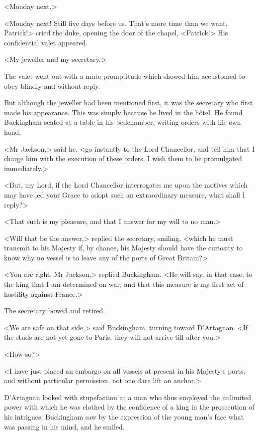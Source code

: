 <Monday next.> 

<Monday next! Still five days before us. That's more time than we want. Patrick!> cried the duke, opening the door of the chapel, <Patrick!> His confidential valet appeared. 

<My jeweller and my secretary.> 

The valet went out with a mute promptitude which showed him accustomed to obey blindly and without reply. 

But although the jeweller had been mentioned first, it was the secretary who first made his appearance. This was simply because he lived in the hôtel. He found Buckingham seated at a table in his bedchamber, writing orders with his own hand. 

<Mr Jackson,> said he, <go instantly to the Lord Chancellor, and tell him that I charge him with the execution of these orders. I wish them to be promulgated immediately.> 

<But, my Lord, if the Lord Chancellor interrogates me upon the motives which may have led your Grace to adopt such an extraordinary measure, what shall I reply?> 

<That such is my pleasure, and that I answer for my will to no man.> 

<Will that be the answer,> replied the secretary, smiling, <which he must transmit to his Majesty if, by chance, his Majesty should have the curiosity to know why no vessel is to leave any of the ports of Great Britain?> 

<You are right, Mr Jackson,> replied Buckingham. <He will say, in that case, to the king that I am determined on war, and that this measure is my first act of hostility against France.> 

The secretary bowed and retired. 

<We are safe on that side,> said Buckingham, turning toward D'Artagnan. <If the studs are not yet gone to Paris, they will not arrive till after you.> 

<How so?> 

<I have just placed an embargo on all vessels at present in his Majesty's ports, and without particular permission, not one dare lift an anchor.> 

D'Artagnan looked with stupefaction at a man who thus employed the unlimited power with which he was clothed by the confidence of a king in the prosecution of his intrigues. Buckingham saw by the expression of the young man's face what was passing in his mind, and he smiled. 

